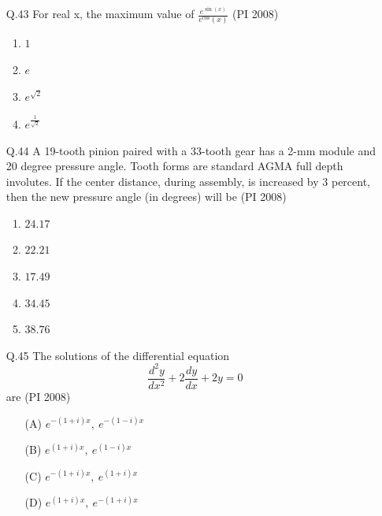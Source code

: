 \documentclass[journal,12pt,onecolumn]{IEEEtran}
\theoremstyle{remark}
\begin{document}
\begin{enumerate}
 \item[\textnormal{Q.43}]  For real x, the maximum value of $\frac{e^{\sin (x)}}{e^{\cos}(x)}$
    \hfill{(PI 2008)}
    \begin{multicols}{4}
    \begin{enumerate}[label=(\Alph*)]
        \item $1$
        \item $e$
        \item $e^{\sqrt{2}}$
        \item $e^{\frac{1}{\sqrt 2}}$
    \end{enumerate}
\end{multicols}
\vspace{1cm}
 \item[\textnormal{Q.44}] A 19-tooth pinion paired with a 33-tooth gear has a 2-mm module and 20 degree pressure angle. Tooth forms are standard AGMA full depth involutes. If the center distance, during assembly, is increased by 3 percent, then the new pressure angle (in degrees) will be   
    \hfill{(PI 2008)}
    \begin{multicols}{4}
    \begin{enumerate}
        \item 
    $24.17$
        \item $22.21$
        \item $17.49$
        \item $34.45$
        \item $38.76$
    \end{enumerate}
\end{multicols}
\vspace{1cm}

\item[\textnormal{Q.45}]
The solutions of the differential equation 
\[
\frac{d^{2}y}{dx^{2}} + 2 \frac{dy}{dx} + 2y = 0
\]
are  
\hfill{(PI 2008)}
\begin{multicols}{4}
    \begin{enumerate}[label=(\Alph*)]
\item[(A)] $e^{-(1+i)x},\ e^{-(1-i)x}$
\item[(B)] $e^{(1+i)x},\ e^{(1-i)x}$
\item[(C)] $e^{-(1+i)x},\ e^{(1+i)x}$
\item[(D)] $e^{(1+i)x},\ e^{-(1+i)x}$
\end{enumerate}
    \end{multicols}
\vspace{1cm}


\end{enumerate}
\end{document}
